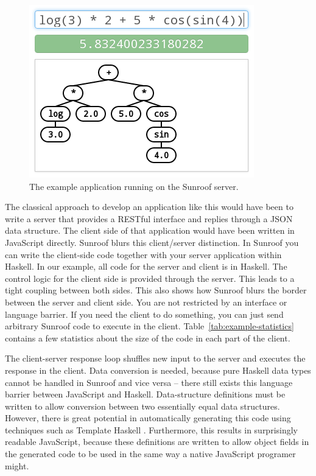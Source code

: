 \documentclass{llncs}
\newcommand{\TabRef}[1]{Table~\ref{#1}}
\begin{document}
\begin{figure}[t]%
\begin{center}%
\includegraphics[scale=0.5]{figures/example-application.png}%
\end{center}%
\caption{The example application running on the Sunroof server.}%
\label{fig:example-application}
\end{figure}


The classical approach to develop an application like this would have 
been to write a server that provides a RESTful interface and replies 
through a JSON data structure. 
The client side of that application would have been written in JavaScript
directly.
Sunroof blurs this client/server distinction.
In Sunroof you can write the client-side code together with
your server application within Haskell. In our example, all code 
for the server and client is in Haskell. The control logic 
for the client side is provided through the server.
This leads to a tight coupling between both sides. 
This also shows how Sunroof blurs the border between the server 
and client side. You are not restricted by an interface or language 
barrier. If you need the client to do something, you can just 
send arbitrary Sunroof code to execute in the client.
%
\TabRef{tab:example-statistics} contains a few statistics 
about the size of the code in each part of the client.

The client-server response loop shuffles new input to the server 
and executes the response in the client.
%
Data conversion is needed, because pure Haskell data types
cannot be handled in Sunroof and vice versa -- there still
exists this language barrier between JavaScript and Haskell. 
Data-structure definitions must be written
to allow conversion between two essentially equal data structures.
However, there is great potential in automatically 
generating this code using techniques such as Template Haskell
\cite{Sheard:02:TemplateMetaProgrammingHaskell}.
Furthermore, this results in surprisingly readable JavaScript,
because these definitions are written to allow object fields
in the generated code to be used in the same way a native JavaScript
programer might.
\end{document}

